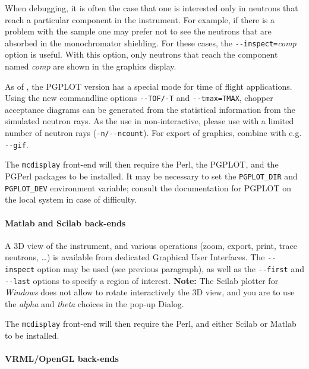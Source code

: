 When debugging, it is often the case that one is interested only in
neutrons that reach a particular component in the instrument. For
example, if there is a problem with the sample one may prefer not to see
the neutrons that are absorbed in the monochromator shielding. For these
cases, the \verb+--inspect=+\textit{comp\/} option is useful. With this
option, only neutrons that reach the component named \textit{comp\/} are
shown in the graphics display.

As of , the PGPLOT version has a special mode for time of
flight applications. Using the new commandline options \verb+--TOF/-T+
and \verb+--tmax=TMAX+, chopper acceptance diagrams can be generated
from the statistical information from the simulated neutron rays. As
the use in non-interactive, please use with a limited number of
neutron rays (\verb+-n/--ncount+). For export of graphics, combine
with e.g. \verb+--gif+.

The \verb+mcdisplay+ front-end will then require the Perl, the PGPLOT, and the
PGPerl packages to be installed. It may be necessary to set the
\verb+PGPLOT_DIR+ and \verb+PGPLOT_DEV+ environment variable; consult the
documentation for PGPLOT on the local system in case of difficulty.
  

\paragraph{Matlab and Scilab back-ends}

A 3D view of the instrument, and various operations (zoom, export, print, trace neutrons, \ldots) is available from dedicated Graphical User Interfaces.
The \verb+--inspect+ option may be used (see previous paragraph), as well as the \verb+--first+ and \verb+--last+ options to specify a region of interest. {\bf Note:} The Scilab plotter for \emph{Windows} does not allow to rotate interactively the 3D view, and you are to use the \emph{alpha} and \emph{theta} choices in the pop-up Dialog.

The \verb+mcdisplay+ front-end will then
require the Perl, and either Scilab or Matlab to be installed.  

\paragraph{VRML/OpenGL back-ends}


